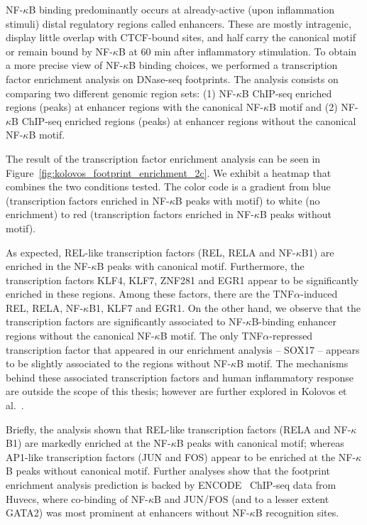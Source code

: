 NF-$\kappa$B binding predominantly occurs at already-active (upon inflammation stimuli) distal regulatory regions called enhancers. These are mostly intragenic, display little overlap with CTCF-bound sites, and half carry the canonical motif or remain bound by NF-$\kappa$B at $60$ min after inflammatory stimulation. To obtain a more precise view of NF-$\kappa$B binding choices, we performed a transcription factor enrichment analysis on DNase-seq footprints. The analysis consists on comparing two different genomic region sets: (1) NF-$\kappa$B ChIP-seq enriched regions (peaks) at enhancer regions with the canonical NF-$\kappa$B motif and (2) NF-$\kappa$B ChIP-seq enriched regions (peaks) at enhancer regions without the canonical NF-$\kappa$B motif.

The result of the transcription factor enrichment analysis can be seen in Figure~\ref{fig:kolovos_footprint_enrichment_2c}. We exhibit a heatmap that combines the two conditions tested. The color code is a gradient from blue (transcription factors enriched in NF-$\kappa$B peaks with motif) to white (no enrichment) to red (transcription factors enriched in NF-$\kappa$B peaks without motif).

As expected, REL-like transcription factors (REL, RELA and NF-$\kappa$B1) are enriched in the NF-$\kappa$B peaks with canonical motif. Furthermore, the transcription factors KLF4, KLF7, ZNF281 and EGR1 appear to be significantly enriched in these regions. Among these factors, there are the TNF$\alpha$-induced REL, RELA, NF-$\kappa$B1, KLF7 and EGR1. On the other hand, we observe that the transcription factors  are significantly associated to NF-$\kappa$B-binding enhancer regions without the canonical NF-$\kappa$B motif. The only TNF$\alpha$-repressed transcription factor that appeared in our enrichment analysis -- SOX17 -- appears to be slightly associated to the regions without NF-$\kappa$B motif. The mechanisms behind these associated transcription factors and human inflammatory response are outside the scope of this thesis; however are further explored in Kolovos et al.~\cite{kolovos2016}.

Briefly, the analysis shown that REL-like transcription factors (RELA and NF-$\kappa$B1) are markedly enriched at the NF-$\kappa$B peaks with canonical motif; whereas AP1-like transcription factors (JUN and FOS) appear to be enriched at the NF-$\kappa$B peaks without canonical motif. Further analyses show that the footprint enrichment analysis prediction is backed by ENCODE~\cite{encode2012} ChIP-seq data from Huvecs, where co-binding of NF-$\kappa$B and JUN/FOS (and to a lesser extent GATA2) was most prominent at enhancers without NF-$\kappa$B recognition sites.

